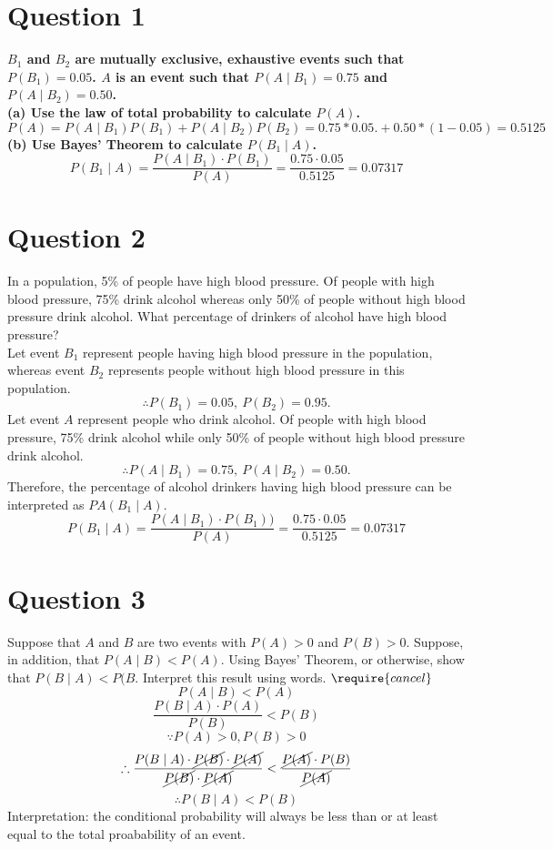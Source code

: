 \documentclass[
]{book}
\begin{document}
\section{Question 1}\label{question-1-2}

\textbf{\(B_1\) and \(B_2\) are mutually exclusive, exhaustive events such that \(P(B_1) = 0.05\). \(A\) is an event such that \(P(A \mid B_1) = 0.75\) and \(P(A \mid B_2) = 0.50\).}\\
\textbf{(a) Use the law of total probability to calculate \(P(A)\).}\\
\[P(A) = P(A \mid B_1)P(B_1) + P(A \mid B_2)P(B_2) = 0.75 * 0.05. + 0.50 * (1 - 0.05) = 0.5125\]
\textbf{(b) Use Bayes' Theorem to calculate \(P(B_1 \mid A)\).}\\
\[P(B_1 \mid A) = \frac{P(A \mid B_1) \cdot P(B_1)}{P(A)} = \frac{0.75 \cdot 0.05}{0.5125} = 0.07317\]

\section{Question 2}\label{question-2-2}

In a population, 5\% of people have high blood pressure. Of people with high blood pressure, 75\% drink alcohol whereas only 50\% of people without high blood pressure drink alcohol. What percentage of drinkers of alcohol have high blood pressure?\\

Let event \(B_1\) represent people having high blood pressure in the population, whereas event \(B_2\) represents people without high blood pressure in this population.
\[\therefore P(B_1) = 0.05, \ P(B_2) = 0.95.\]
Let event \(A\) represent people who drink alcohol. Of people with high blood pressure, 75\% drink alcohol while only 50\% of people without high blood pressure drink alcohol.
\[\therefore P(A \mid B_1) = 0.75, \ P(A \mid B_2) = 0.50.\]
Therefore, the percentage of alcohol drinkers having high blood pressure can be interpreted as \(PA(B_1 \mid A)\).
\[P(B_1 \mid A) = \frac{P(A \mid B_1) \cdot P(B_1))}{P(A)} = \frac{0.75 \cdot 0.05}{0.5125} = 0.07317\]

\section{Question 3}\label{question-3-2}

Suppose that \(A\) and \(B\) are two events with \(P(A) > 0\) and \(P(B) > 0\). Suppose, in addition, that \(P(A \mid B) < P(A)\). Using Bayes' Theorem, or otherwise, show that \(P(B \mid A) < P(B\). Interpret this result using words.
\(\require{cancel}\)
\[P(A \mid B) < P(A)\]
\[\frac{P(B \mid A) \cdot P(A)}{P(B)} < P(B)\]
\[\because P(A) > 0, P(B) > 0\]
\[\therefore \frac{P(B \mid A) \cdot \cancel{P(B)} \cdot \cancel{P(A)}}{\cancel{P(B)} \cdot \cancel{P(A)}} < \frac{\cancel{P(A)} \cdot P(B)}{\cancel{P(A)}}\]
\[\therefore P(B \mid A) < P(B)\]
Interpretation: the conditional probability will always be less than or at least equal to the total proabability of an event.
\end{document}
